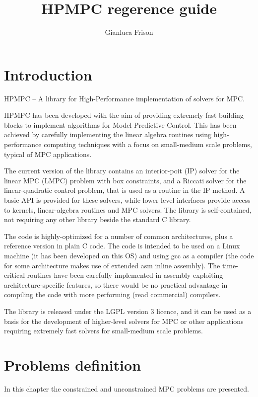 \documentclass[a4paper]{report}
\title{HPMPC regerence guide}
\author{Gianluca Frison}
\begin{document}
\maketitle
\tableofcontents

\chapter{Introduction}

HPMPC -- A library for High-Performance implementation of solvers for MPC.

HPMPC has been developed with the aim of providing extremely fast building blocks to implement algorithms for Model Predictive Control. 
This has been achieved by carefully implementing the linear algebra routines using high-performance computing techniques with a focus on small-medium scale problems, typical of MPC applications.

The current version of the library contains an interior-poit (IP) solver for the linear MPC (LMPC) problem with box constraints, and a Riccati solver for the linear-quadratic control problem, that is used as a routine in the IP method.
A basic API is provided for these solvers, while lower level interfaces provide access to kernels, linear-algebra routines and MPC solvers.
The library is self-contained, not requiring any other library beside the standard C library.

The code is highly-optimized for a number of common architectures, plus a reference version in plain C code.
The code is intended to be used on a Linux machine (it has been developed on this OS) and using gcc as a compiler (the code for some architecture makes use of extended asm inline assembly).
The time-critical routines have been carefully implemented in assembly exploiting architecture-specific features, so there would be no practical advantage in compiling the code with more performing (read commercial) compilers.

The library is released under the LGPL version 3 licence, and it can be used as a basis for the development of higher-level solvers for MPC or other applications requiring extremely fast solvers for small-medium scale problems.



\chapter{Problems definition}

In this chapter the constrained and unconstrained MPC problems are presented.
\end{document}
